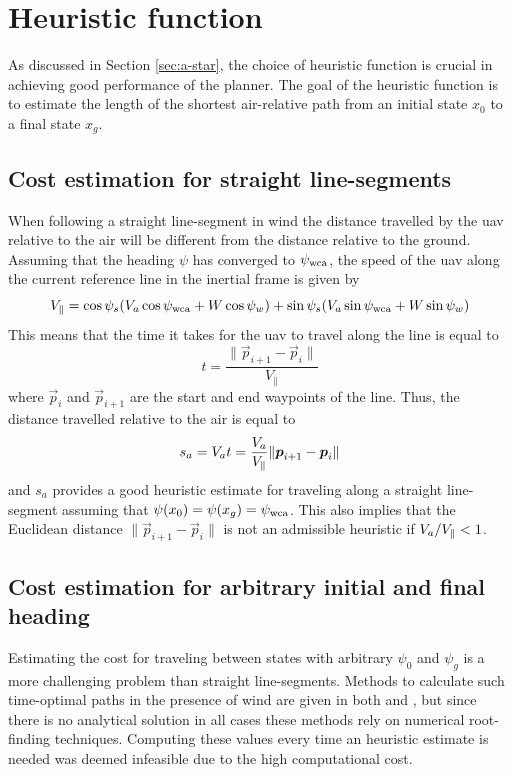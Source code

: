 \section{Heuristic function}
As discussed in Section \ref{sec:a-star}, the choice of heuristic function is 
crucial in achieving good performance of the planner. The goal of the heuristic function is to estimate the 
length of the shortest air-relative path from an initial state $x_0$ to a final state $x_g$.

\subsection{Cost estimation for straight line-segments}\label{sec:straight_path_heuristic}
When following a straight line-segment in wind the distance travelled by the \ac{uav} relative to the air will be different from the distance relative to the ground. Assuming that the heading $\psi$ has converged to $\psi_{\text{wca}}$, 
the speed of the \ac{uav} along the current reference line in the inertial frame is given by 
\begin{equation}
    V_{\parallel}=\cos\psi_s(V_a\cos\psi_{\text{wca}}+W\cos\psi_w) + \sin\psi_s(V_a\sin\psi_{\text{wca}}+W\sin\psi_w)
\end{equation}
This means that the time it takes for the \ac{uav} to travel along the line is equal to 
\begin{equation}
    t=\frac{\|\vec{p}_{i+1}-\vec{p}_i\|}{V_\parallel}
\end{equation}
where $\vec{p}_{i}$ and $\vec{p}_{i+1}$ are the start and end waypoints of the line. Thus, the distance 
travelled relative to the air is equal to 
\begin{equation}
    s_a=V_at=\frac{V_a}{V_\parallel}\|\boldsymbol{p}_{i+1}-\boldsymbol{p}_{i}\|
\end{equation}
and $s_a$ provides a good heuristic estimate for traveling along a straight line-segment assuming that $\psi(x_0)=\psi(x_g)=\psi_{\text{wca}}$.
This also implies that the Euclidean distance $\|\vec{p}_{i+1}-\vec{p}_{i}\|$ is not an admissible heuristic if 
$V_a/V_\parallel<1$.

\subsection{Cost estimation for arbitrary initial and final heading}
Estimating the cost for traveling between states with arbitrary $\psi_0$ and $\psi_g$ is a more challenging problem than straight line-segments.
Methods to calculate such time-optimal paths in the presence of wind are given in both \cite{optimal_path_target} and \cite{optimal_path_trochoidal}, 
but since there is no analytical solution in all cases these methods rely on numerical root-finding techniques.
Computing these values every time an heuristic estimate is needed was deemed infeasible due to the high computational cost.

